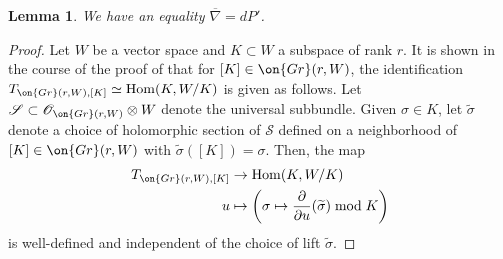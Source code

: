 \documentclass[12 pt]{amsart}
\theoremstyle{plain}
\newtheorem{lemma}[subsubsection]{Lemma}
\theoremstyle{definition}
\theoremstyle{remark}
\numberwithin{equation}{section}
\DeclareMathOperator\Hom{Hom}
\begin{document}
\begin{lemma}
	\label{lemma:connection-and-period-map}
	We have an equality $\overline \nabla = dP'$.
\end{lemma}
\begin{proof}
	Let $W$ be a vector space and $K\subset W$ a subspace of rank $r$. It is shown in the course of the proof of \cite[Lemma 10.7]{Voisin:hodgeTheory}
	that for $[K] \in \on{Gr}(r,W)$, the identification $T_{\on{Gr}(r,W),[K]} \simeq
	\Hom(K,W/K)$ is given as follows.
	Let $\mathscr S \subset \mathscr{O}_{\on{Gr}(r,W)} \otimes W$ denote the universal
	subbundle.
	Given $\sigma \in K$, let $\widetilde{\sigma}$
	denote a choice of holomorphic section of $\mathscr S$
	defined on a neighborhood of $[K] \in \on{Gr}(r,W)$ with $\widetilde{\sigma}([K]) =
	\sigma$.
	Then, the map 
	\begin{align*}
		T_{\on{Gr}(r, W), [K]} &\to \Hom(K, W/K) \\
		u &\mapsto \left( \sigma \mapsto \frac{\partial }{\partial
		u} (\widetilde{\sigma}) \bmod K \right)
	\end{align*}
	is well-defined and independent of the choice of lift $\widetilde{\sigma}$.


\end{proof}
\end{document}
